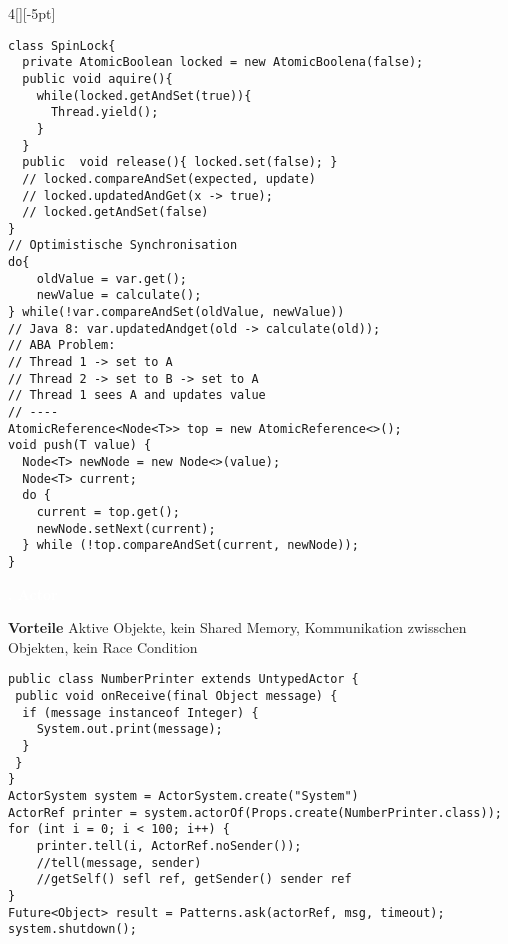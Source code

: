 \documentclass[%
	pdftex,%
	a4paper,%
	landscape,%
	ngerman,
	oneside,%
	6pt,%
	halfparskip,%
]{scrbook}
\newenvironment{mainbox}{%
  \def\FrameCommand{\fboxrule 1px \fcolorbox{black}{spec_blue}}%
  \MakeFramed {\advance\hsize-\width \FrameRestore}}%
 {\endMakeFramed}
\newcommand{\maintopic}[1]{\setcounter{subtopicenum}{0}\setcounter{subsubtopicenum}{0}\vspace{-4px}\begin{mainbox}\textcolor{white}{\textbf{\large{\stepcounter{maintopicenum}\Roman{maintopicenum}. #1}}}\end{mainbox}\vspace{-4px}}
\newenvironment{tight-itemize}
{ \begin{itemize}
    \setlength{\itemsep}{0px}
    \setlength{\parskip}{0px}
    \setlength{\parsep}{0px}  }
{ \end{itemize}                  }
\begin{document}
\begin{multicols}{4}[][-5pt]
\begin{tight-itemize}
\end{tight-itemize}
\begin{lstlisting}
class SpinLock{
  private AtomicBoolean locked = new AtomicBoolena(false);
  public void aquire(){
    while(locked.getAndSet(true)){
      Thread.yield();
    }
  }
  public  void release(){ locked.set(false); }
  // locked.compareAndSet(expected, update)
  // locked.updatedAndGet(x -> true);
  // locked.getAndSet(false)
}
// Optimistische Synchronisation
do{
    oldValue = var.get();
    newValue = calculate();
} while(!var.compareAndSet(oldValue, newValue))
// Java 8: var.updatedAndget(old -> calculate(old));
// ABA Problem:
// Thread 1 -> set to A
// Thread 2 -> set to B -> set to A
// Thread 1 sees A and updates value
// ----
AtomicReference<Node<T>> top = new AtomicReference<>();
void push(T value) {
  Node<T> newNode = new Node<>(value);
  Node<T> current;
  do {
    current = top.get();
    newNode.setNext(current);
  } while (!top.compareAndSet(current, newNode));
}
\end{lstlisting}
\maintopic{Actor}
\begin{tight-itemize}
	\item{\textbf{Vorteile} Aktive Objekte, kein Shared Memory, Kommunikation zwisschen Objekten, kein Race Condition}
\end{tight-itemize}
\begin{lstlisting}
public class NumberPrinter extends UntypedActor {
 public void onReceive(final Object message) {
  if (message instanceof Integer) {
    System.out.print(message);
  }
 }
}
ActorSystem system = ActorSystem.create("System")
ActorRef printer = system.actorOf(Props.create(NumberPrinter.class));
for (int i = 0; i < 100; i++) {
    printer.tell(i, ActorRef.noSender());
    //tell(message, sender)
    //getSelf() sefl ref, getSender() sender ref
}
Future<Object> result = Patterns.ask(actorRef, msg, timeout);
system.shutdown();
\end{lstlisting}


\end{multicols}
\end{document}
